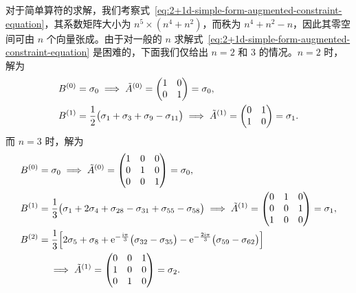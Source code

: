 对于简单算符的求解，我们考察式~\eqref{eq:2+1d-simple-form-augmented-constraint-equation}，其系数矩阵大小为 $n^5\times(n^4+n^2)$，而秩为 $n^4+n^2-n$，因此其零空间可由 $n$ 个向量张成。由于对一般的 $n$ 求解式~\eqref{eq:2+1d-simple-form-augmented-constraint-equation} 是困难的，下面我们仅给出 $n=2$ 和 3 的情况。$n=2$ 时，解为
\begin{align}
  B^{(0)} &= \sigma_0
    \implies \tilde{A}^{(0)} = \begin{pmatrix} 1 & 0 \\ 0 & 1 \end{pmatrix} = \sigma_0, \notag \\
  B^{(1)} &= \frac12 \bigl( \sigma_1 + \sigma_3 + \sigma_9 - \sigma_{11} \bigr)
    \implies \tilde{A}^{(1)} = \begin{pmatrix} 0 & 1 \\ 1 & 0 \end{pmatrix} = \sigma_1.
\end{align}
而 $n=3$ 时，解为
\begin{align}
  B^{(0)} &= \sigma_0
    \implies \tilde{A}^{(0)} = \begin{pmatrix} 1 & 0 & 0 \\ 0 & 1 & 0 \\ 0 & 0 & 1 \end{pmatrix} = \sigma_0, \notag \\
  B^{(1)} &= \frac13 \bigl( \sigma_1 + 2\sigma_4 + \sigma_{28} - \sigma_{31} + \sigma_{55} - \sigma_{58} \bigr)
    \implies \tilde{A}^{(1)} = \begin{pmatrix} 0 & 1 & 0 \\ 0 & 0 & 1 \\ 1 & 0 & 0 \end{pmatrix} = \sigma_1, \notag \\
  B^{(2)} &= \frac13 \Bigl[
      2\sigma_5 + \sigma_8 + \mathrm{e}^{-\frac{\mathrm{i}\pi}{3}} \bigl( \sigma_{32} - \sigma_{35} \bigr)
    - \mathrm{e}^{-\frac{2\mathrm{i}\pi}{3}} \bigl( \sigma_{59} - \sigma_{62} \bigr)
  \Bigr] \notag \\
    &\quad \implies \tilde{A}^{(1)} = \begin{pmatrix} 0 & 0 & 1 \\ 1 & 0 & 0 \\ 0 & 1 & 0 \end{pmatrix} = \sigma_2.
\end{align}

